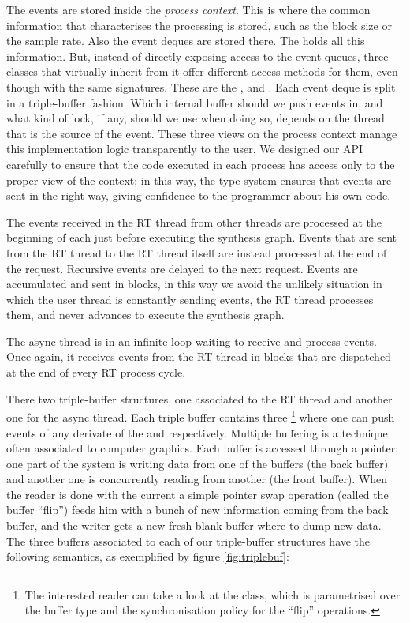 The events are stored inside the \emph{process context}. This is where
the common information that characterises the processing is stored,
such as the block size or the sample rate. Also the event deques are
stored there. The  holds all this
information. But, instead of directly exposing access to the event
queues, three classes that virtually inherit from it offer different
access methods for them, even though with the same signatures. These
are the ,  and
. Each event deque is split in a
triple-buffer fashion. Which internal buffer should we push events in,
and what kind of lock, if any, should we use when doing so, depends on
the thread that is the source of the event. These three views on the
process context manage this implementation logic transparently to the
user. We designed our API carefully to ensure that the code executed
in each process has access only to the proper view of the context; in
this way, the type system ensures that events are sent in the right
way, giving confidence to the programmer about his own code.

The events received in the RT thread from other threads are processed
at the beginning of each  just before
executing the synthesis graph. Events that are sent from the RT thread
to the RT thread itself are instead processed at the end of the
request. Recursive events are delayed to the next request. Events are
accumulated and sent in blocks, in this way we avoid the unlikely
situation in which the user thread is constantly sending events, the
RT thread processes them, and never advances to execute the synthesis
graph.

\label{fig:triplebuf}
The async thread is in an infinite loop waiting to receive and process
events. Once again, it receives events from the RT thread in blocks
that are dispatched at the end of every RT process cycle.

There two triple-buffer structures, one associated to the RT thread
and another one for the async thread. Each triple buffer contains
three \footnote{The interested reader can take a
  look at the  class, which is
  parametrised over the buffer type and the synchronisation policy for
the ``flip'' operations.} where one can push events of any derivate of
the  and  respectively. Multiple
buffering is a technique often associated to computer graphics. Each
buffer is accessed through a pointer; one part of the system is
writing data from one of the buffers (the back buffer) and another one
is concurrently reading from another (the front buffer). When the
reader is done with the current a simple pointer swap operation
(called the buffer ``flip'') feeds him with a bunch of new information
coming from the back buffer, and the writer gets a new fresh blank
buffer where to dump new data. The three buffers associated to each of
our triple-buffer structures have the following semantics, as
exemplified by figure \ref{fig:triplebuf}:


